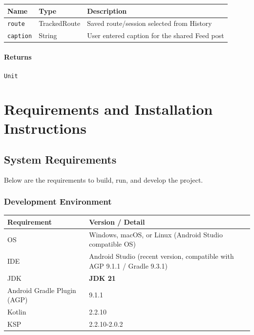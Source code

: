 \documentclass{article}
\begin{document}
                \begin{tabular}{p{3cm} p{4cm} p{7cm}}
                \toprule
                \textbf{Name} & \textbf{Type} & \textbf{Description} \\ \midrule
                \texttt{route} & TrackedRoute & Saved route/session selected from History \\ \addlinespace
                \texttt{caption} & String & User entered caption for the shared Feed post \\ \bottomrule
                \end{tabular}

                \paragraph{Returns} \texttt{Unit}

            \newpage

            \section{Requirements and Installation Instructions}
                
                \subsection{System Requirements}

                    Below are the requirements to build, run, and develop the project.

                    \subsubsection*{Development Environment}

                        \begin{center}
                            \begin{tabular}{p{5cm} p{7cm}}
                                \toprule
                                \textbf{Requirement} & \textbf{Version / Detail} \\ \midrule
                                    OS & Windows, macOS, or Linux (Android Studio compatible OS) \\ \addlinespace
                                    IDE & Android Studio (recent version, compatible with AGP 9.1.1 / Gradle 9.3.1) \\ \addlinespace
                                    JDK & \textbf{JDK 21} \\ \addlinespace
                                    Android Gradle Plugin (AGP) & 9.1.1 \\ \addlinespace
                                    Kotlin & 2.2.10 \\ \addlinespace
                                    KSP & 2.2.10-2.0.2 \\ \bottomrule
                            \end{tabular}
                        \end{center}
\end{document}
